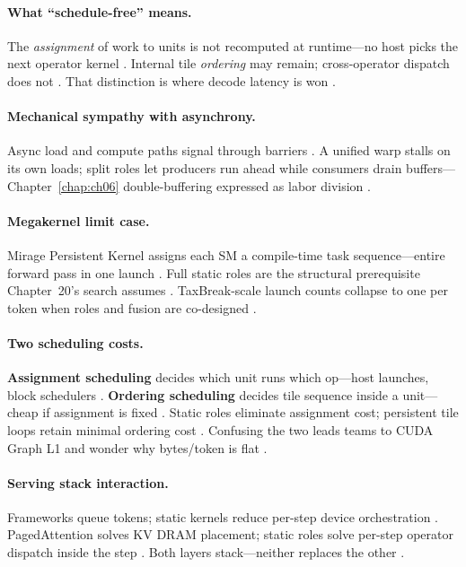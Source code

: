 \paragraph{What ``schedule-free'' means.}
The \emph{assignment} of work to units is not recomputed at runtime---no host picks the next operator kernel \citep{taxbreak2026,mpk2025}.
Internal tile \emph{ordering} may remain; cross-operator dispatch does not \citep{shah2024flashattention3}.
That distinction is where decode latency is won \citep{memoryfloor2026,patel2025llminference}.

\paragraph{Mechanical sympathy with asynchrony.}
Async load and compute paths signal through barriers \citep{semianalysis2024tma,nvidia2022hopper}.
A unified warp stalls on its own loads; split roles let producers run ahead while consumers drain buffers---Chapter~\ref{chap:ch06} double-buffering expressed as labor division \citep{dao2022flashattention,yirage2026}.

\paragraph{Megakernel limit case.}
Mirage Persistent Kernel assigns each SM a compile-time task sequence---entire forward pass in one launch \citep{mpk2025,wu2024mirage}.
Full static roles are the structural prerequisite Chapter~20's search assumes \citep{mpk2025,yirage2026}.
TaxBreak-scale launch counts collapse to one per token when roles and fusion are co-designed \citep{taxbreak2026,memoryfloor2026}.

\paragraph{Two scheduling costs.}
\textbf{Assignment scheduling} decides which unit runs which op---host launches, block schedulers \citep{taxbreak2026,mpk2025}.
\textbf{Ordering scheduling} decides tile sequence inside a unit---cheap if assignment is fixed \citep{shah2024flashattention3,patel2025llminference}.
Static roles eliminate assignment cost; persistent tile loops retain minimal ordering cost \citep{nvidia2024cudagraphs,shah2024flashattention3}.
Confusing the two leads teams to CUDA Graph L1 and wonder why bytes/token is flat \citep{memoryfloor2026,dao2022flashattention,yirage2026}.

\paragraph{Serving stack interaction.}
Frameworks queue tokens; static kernels reduce per-step device orchestration \citep{kwon2023vllm,patel2025llminference}.
PagedAttention solves KV DRAM placement; static roles solve per-step operator dispatch inside the step \citep{kwon2023vllm,taxbreak2026}.
Both layers stack---neither replaces the other \citep{dao2023flashdecoding,yirage2026}.

